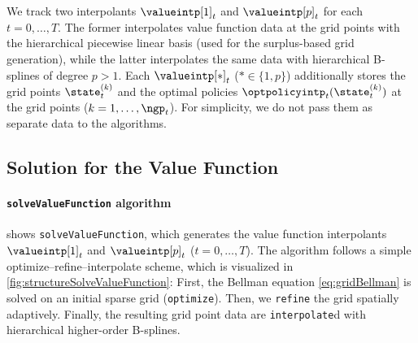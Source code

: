 
We track two interpolants $\valueintp[1]_t$ and $\valueintp[p]_t$
for each $t = 0, \dotsc, T$.
The former interpolates value function data at the grid points
with the hierarchical piecewise linear basis
(used for the surplus-based grid generation),
while the latter interpolates the same data with hierarchical B-splines
of degree $p > 1$.
Each $\valueintp[\ast]_t$ ($\ast \in \{1, p\}$)
additionally stores the grid points $\state_t^{(k)}$
and the optimal policies $\optpolicyintp_t(\state_t^{(k)})$
at the grid points ($k = 1, \dotsc, \ngp_t$).
For simplicity, we do not pass them as separate data
to the algorithms.



\subsection{Solution for the Value Function}
\label{sec:822solveValueFunction}

\paragraph{\texttt{solveValueFunction} algorithm}

 shows \texttt{solveValueFunction},
which generates the value function interpolants
$\valueintp[1]_t$ and $\valueintp[p]_t$ ($t = 0, \dotsc, T$).
The algorithm follows a simple optimize--refine--interpolate scheme,
which is visualized in \cref{fig:structureSolveValueFunction}:
First, the Bellman equation \eqref{eq:gridBellman} is solved
on an initial sparse grid (\texttt{optimize}).
Then, we \texttt{refine} the grid spatially adaptively.
Finally, the resulting grid point data are \texttt{interpolate}d
with hierarchical higher-order B-splines.

